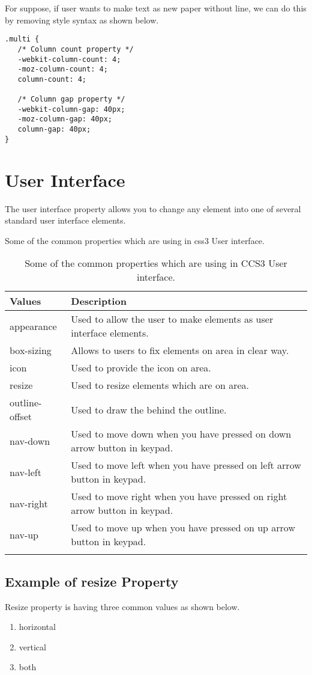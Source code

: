 \documentclass[a4paper,oneside]{book}
\numberwithin{equation}{chapter}
\begin{document}
For suppose, if user wants to make text as new paper without line, we can do this by removing style syntax as shown below.
\begin{verbatim}
.multi {
   /* Column count property */
   -webkit-column-count: 4;
   -moz-column-count: 4;
   column-count: 4;
   
   /* Column gap property */
   -webkit-column-gap: 40px; 
   -moz-column-gap: 40px; 
   column-gap: 40px;
}
\end{verbatim}
\section{User Interface}
The user interface property allows you to change any element into one of several standard user interface elements.

Some of the common properties which are using in css3 User interface.
\begin{center}
\begin{longtable}{|l|p{9cm}|}
\hline
\textbf{Values} & \textbf{Description}\\
\hline
appearance & Used to allow the user to make elements as user interface elements.\\
\hline
box-sizing & Allows to users to fix elements on area in clear way.\\
\hline
icon & Used to provide the icon on area.\\
\hline
resize & Used to resize elements which are on area.\\
\hline
outline-offset & Used to draw the behind the outline.\\
\hline
nav-down & Used to move down when you have pressed on down arrow button in keypad.\\
\hline
nav-left & Used to move left when you have pressed on left arrow button in keypad.\\
\hline
nav-right & Used to move right when you have pressed on right arrow button in keypad.\\
\hline
nav-up & Used to move up when you have pressed on up arrow button in keypad.\\
\hline
\caption{Some of the common properties which are using in CCS3 User interface.}
\end{longtable}
\end{center}
\subsection{Example of resize Property}
Resize property is having three common values as shown below.
\begin{enumerate}
\item horizontal
\item vertical
\item both
\end{enumerate}
\end{document}
